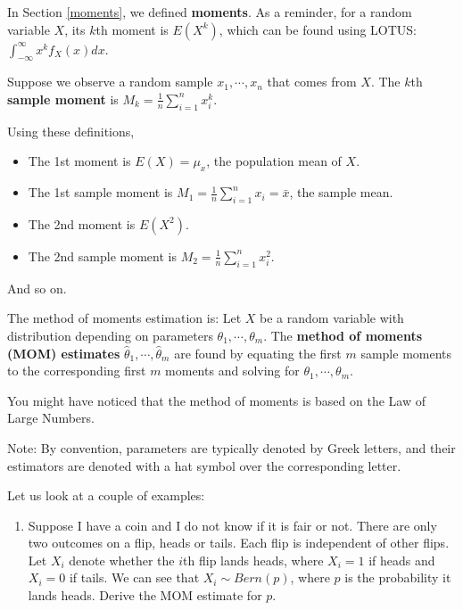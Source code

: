 \documentclass[
]{book}
\providecommand{\tightlist}{%
  \setlength{\itemsep}{0pt}\setlength{\parskip}{0pt}}
\begin{document}
In Section \ref{moments}, we defined \textbf{moments}. As a reminder, for a random variable \(X\), its \(k\)th moment is \(E(X^k)\), which can be found using LOTUS: \(\int_{-\infty}^{\infty} x^k f_X(x) dx\).

Suppose we observe a random sample \(x_1, \cdots, x_n\) that comes from \(X\). The \(k\)th \textbf{sample moment} is \(M_k = \frac{1}{n} \sum_{i=1}^n x_i^k\).

Using these definitions,

\begin{itemize}
\tightlist
\item
  The 1st moment is \(E(X) = \mu_x\), the population mean of \(X\).
\item
  The 1st sample moment is \(M_1 = \frac{1}{n} \sum_{i=1}^n x_i = \bar{x}\), the sample mean.
\item
  The 2nd moment is \(E(X^2)\).
\item
  The 2nd sample moment is \(M_2 = \frac{1}{n} \sum_{i=1}^n x_i^2\).
\end{itemize}

And so on.

The method of moments estimation is: Let \(X\) be a random variable with distribution depending on parameters \(\theta_1, \cdots, \theta_m\). The \textbf{method of moments (MOM) estimates} \(\hat{\theta}_1, \cdots, \hat{\theta}_m\) are found by equating the first \(m\) sample moments to the corresponding first \(m\) moments and solving for \(\theta_1, \cdots, \theta_m\).

You might have noticed that the method of moments is based on the Law of Large Numbers.

Note: By convention, parameters are typically denoted by Greek letters, and their estimators are denoted with a hat symbol over the corresponding letter.

Let us look at a couple of examples:

\begin{enumerate}
\def\labelenumi{\arabic{enumi}.}
\tightlist
\item
  Suppose I have a coin and I do not know if it is fair or not. There are only two outcomes on a flip, heads or tails. Each flip is independent of other flips. Let \(X_i\) denote whether the \(i\)th flip lands heads, where \(X_i = 1\) if heads and \(X_i = 0\) if tails. We can see that \(X_i \sim Bern(p)\), where \(p\) is the probability it lands heads. Derive the MOM estimate for \(p\).
\end{enumerate}
\end{document}
